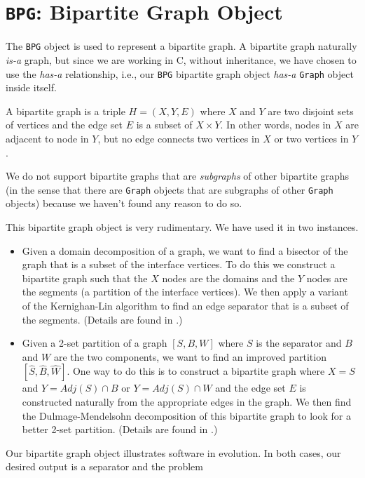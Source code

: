 \par
\chapter{{\tt BPG}: Bipartite Graph Object}
\label{chapter:BPG}
\par
The {\tt BPG} object is used to represent a bipartite graph.
A bipartite graph naturally {\it is-a} graph,
but since we are working in C, without inheritance,
we have chosen to use the {\it has-a} relationship,
i.e., our {\tt BPG} bipartite graph object {\it has-a}
{\tt Graph} object inside itself.
\par
A bipartite graph is a triple $H = (X, Y, E)$ where
$X$ and $Y$ are two disjoint sets of vertices and the edge set $E$
is a subset of $X \times Y$.
In other words, nodes in $X$ are adjacent to node in $Y$,
but no edge connects two vertices in $X$ or two vertices in $Y$.
\par
We do not support bipartite graphs that are {\it subgraphs}
of other bipartite graphs (in the sense that there are
{\tt Graph} objects that are subgraphs of other {\tt Graph}
objects) because we haven't found any reason to do so.
\par
This bipartite graph object is very rudimentary.
We have used it in two instances.
\begin{itemize}
\item
Given a domain decomposition of a graph, we want to find a bisector
of the graph that is a subset of the interface vertices.
To do this we construct a bipartite graph such that the $X$ nodes
are the domains and the $Y$ nodes are the
segments (a partition of the interface vertices).
We then apply a variant of the Kernighan-Lin algorithm to find an
edge separator that is a subset of the segments.
(Details are found in \cite{ash97-DDSEP}.)
\item
Given a 2-set partition of a graph $[S,B,W]$ where $S$ is the
separator and $B$ and $W$ are the two components, we want to find
an improved partition
$[{\widehat S}, {\widehat B}, {\widehat W}]$.
One way to do this is to construct a bipartite graph where $X = S$
and $Y = Adj(S) \cap B$ or $Y = Adj(S) \cap W$
and the edge set $E$ is constructed naturally from the appropriate
edges in the graph.
We then find the Dulmage-Mendelsohn decomposition of this bipartite
graph to look for a better 2-set partition.
(Details are found in \cite{ash98-maxflow}.)
\end{itemize}
Our bipartite graph object illustrates software in evolution.
In both cases, our desired output is a separator and the problem
